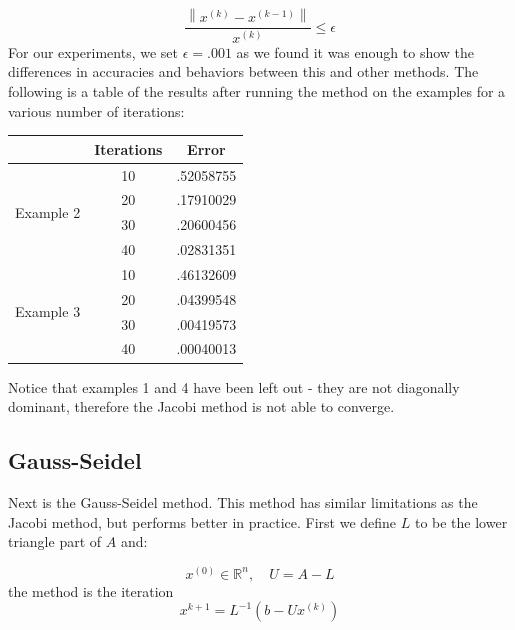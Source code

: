 \documentclass[11pt]{article}	%
\newcommand\norm[1]{\left\lVert#1\right\rVert}
\begin{document}
    \begin{equation}
        \frac{\norm{x^{(k)} - x^{(k-1)}}}{x^{(k)}} \leq \epsilon
    \end{equation}
    For our experiments, we set $\epsilon = .001$ as we found it was enough to show the differences in accuracies and behaviors between this and other methods. The following is a table of the results after running the method on the examples for a various number of iterations:
    \begin{center}
     \label{tab:title}
        \begin{tabular}{||c|c|c||}
            \hline
            & Iterations & Error \\ [.35em]
            \hline
            \multirow{4}{5em}{Example 2} & 10 & .52058755 \\ [.25em]
            & 20 & .17910029 \\ [.25em]
            & 30 & .20600456 \\ [.25em]
            & 40 & .02831351 \\ [.25em]
            \hline
            \multirow{4}{5em}{Example 3} & 10 & .46132609 \\ [.25em]
            & 20 & .04399548 \\ [.25em]
            & 30 & .00419573 \\ [.25em]
            & 40 & .00040013 \\ [.25em]
            \hline
        \end{tabular}
    \end{center}

    Notice that examples 1 and 4 have been left out - they are not diagonally dominant, therefore the Jacobi method is not able to converge.

\pagebreak
\subsection{Gauss-Seidel}
Next is the Gauss-Seidel method. This method has similar limitations as the Jacobi method, but performs better in practice.
First we define $L$ to be the lower triangle part of $A$ and:

$$  x^{(0)}\in {\mathbb R}^n, \quad U = A - L $$
the method is the iteration
\begin{equation}\label{eq:jacobi-eq-1}
    x^{k+1} = L^{-1}(b - Ux^{(k)})
\end{equation}
\end{document}
